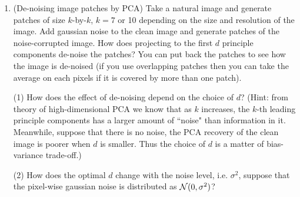 \documentclass[english]{article}
\begin{document}
\begin{enumerate}
\item
(De-noising image patches by PCA) 
Take a natural image and generate patches of size $k$-by-$k$, $k=7$ or 10 depending on the size and resolution of the image.
Add gaussian noise to the clean image and generate patches of the noise-corrupted image.
How does projecting to the first $d$ principle components de-noise the patches? 
You can put back the patches to see how the image is de-noised 
(if you use overlapping patches then you can take the average on each pixels if it is covered by more than one patch). 

(1) How does the effect of de-noising depend on the choice of $d$? (Hint: from theory of high-dimensional PCA we know that as $k$ increases, the $k$-th leading principle components has a larger amount of ``noise" than information in it. Meanwhile, suppose that there is no noise, the PCA recovery of the clean image is poorer when $d$ is smaller. Thus the choice of $d$ is a matter of bias-variance trade-off.)

(2) How does the optimal $d$ change with the noise level, i.e. $\sigma^2$, suppose that the pixel-wise gaussian noise is distributed as ${\cal N}(0,\sigma^2)$?



\end{enumerate}
\end{document}
